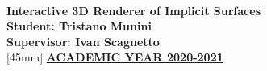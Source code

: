 \documentclass{article}
\begin{document}

\begin{titlepage}
  ~\\
  [50mm]
 	\centering
  \Huge{\textbf{Interactive 3D Renderer of Implicit Surfaces}}\\
 	[50mm]
  \Large{\textbf{
      Student: Tristano Munini \\
  Supervisor: Ivan Scagnetto
  }}\\
 	[45mm]
 	\centering
  \LARGE{\underline{\textbf{ACADEMIC YEAR 2020-2021}}}\\
\end{titlepage}

\tableofcontents
\thispagestyle{empty}
\cleardoublepage
\setcounter{page}{1}






\clearpage


\cleardoublepage
\printbibliography
\end{document}
